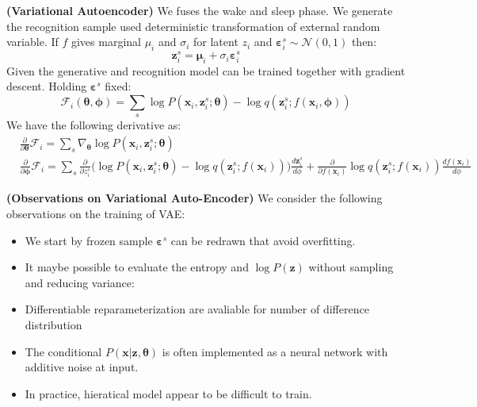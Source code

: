 \begin{definition}{\textbf{(Variational Autoencoder)}}
    We fuses the wake and sleep phase. We generate the recognition sample used deterministic transformation of external random variable. If $f$ gives marginal $\mu_i$ and $\sigma_i$ for latent $z_i$ and $\boldsymbol \varepsilon^s_i \sim\mathcal{N}(0, 1)$ then:
    \begin{equation*}
        \boldsymbol z^s_i = \boldsymbol \mu_i + \sigma_i\boldsymbol \varepsilon^s_i
    \end{equation*}
    Given the generative and recognition model can be trained together with gradient descent. Holding $\boldsymbol \varepsilon^s$ fixed:
    \begin{equation*}
        \mathcal{F}_i(\boldsymbol \theta, \boldsymbol \phi) = \sum_s \log P(\boldsymbol x_i, \boldsymbol z^s_i;\boldsymbol \theta) - \log q(\boldsymbol z^s_i ; f(\boldsymbol x_i, \boldsymbol \phi))
    \end{equation*}
    We have the following derivative as:
    \begin{equation*}
    \begin{aligned}
        &\frac{\partial}{\partial \boldsymbol \theta}\mathcal{F}_i = \sum_s \nabla_{\boldsymbol \theta}\log P(\boldsymbol x_i, \boldsymbol z_i^s ; \boldsymbol \theta) \\
        &\frac{\partial}{\partial \boldsymbol \phi}\mathcal{F}_i = \sum_s \frac{\partial}{\partial z^s_i} \Big( \log P(\boldsymbol x_i, \boldsymbol z_i^s ; \boldsymbol \theta) - \log q(\boldsymbol z^s_i ; f(\boldsymbol x_i)) \Big)\frac{d\boldsymbol z_i^s}{d\phi} + \frac{\partial}{\partial f(\boldsymbol x_i)} \log q(\boldsymbol z^s_i ; f(\boldsymbol x_i))\frac{df(\boldsymbol x_i)}{d\phi}
    \end{aligned}
    \end{equation*}
\end{definition}

\begin{remark}{\textbf{(Observations on Variational Auto-Encoder)}}
    We consider the following observations on the training of VAE:
    \begin{itemize}
        \item We start by frozen sample $\boldsymbol \varepsilon^s$ can be redrawn that avoid overfitting. 
        \item It maybe possible to evaluate the entropy and $\log P(\boldsymbol z)$ without sampling and reducing variance:
        \item Differentiable reparameterization are avaliable for number of difference distribution
        \item The conditional $P(\boldsymbol x|\boldsymbol z, \boldsymbol \theta)$ is often implemented as a neural network with additive noise at input.
        \item In practice, hieratical model appear to be difficult to train. 
    \end{itemize}
\end{remark}

